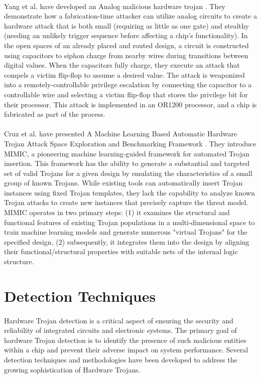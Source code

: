 \paragraph*{}
Yang et al. have developed an Analog malicious hardware trojan \cite{7546493}. They demonstrate how a fabrication-time attacker can utilize analog circuits to create a hardware attack that is both small (requiring as little as one gate) and stealthy (needing an unlikely trigger sequence before affecting a chip's functionality). In the open spaces of an already placed and routed design, a circuit is constructed using capacitors to siphon charge from nearby wires during transitions between digital values. When the capacitors fully charge, they execute an attack that compels a victim flip-flop to assume a desired value. The attack is weaponized into a remotely-controllable privilege escalation by connecting the capacitor to a controllable wire and selecting a victim flip-flop that stores the privilege bit for their processor. This attack is implemented in an OR1200 processor, and a chip is fabricated as part of the process.
\paragraph*{}
Cruz et al. have presented A Machine Learning Based Automatic Hardware Trojan Attack Space Exploration and Benchmarking Framework \cite{cruz2022machine}. They introduce MIMIC, a pioneering machine learning-guided framework for automated Trojan insertion. This framework has the ability to generate a substantial and targeted set of valid Trojans for a given design by emulating the characteristics of a small group of known Trojans. While existing tools can automatically insert Trojan instances using fixed Trojan templates, they lack the capability to analyze known Trojan attacks to create new instances that precisely capture the threat model. MIMIC operates in two primary steps: (1) it examines the structural and functional features of existing Trojan populations in a multi-dimensional space to train machine learning models and generate numerous "virtual Trojans" for the specified design, (2) subsequently, it integrates them into the design by aligning their functional/structural properties with suitable nets of the internal logic structure. 
\section{Detection Techniques}
\paragraph*{}
Hardware Trojan detection is a critical aspect of ensuring the security and reliability of integrated circuits and electronic systems. The primary goal of hardware Trojan detection is to identify the presence of such malicious entities within a chip and prevent their adverse impact on system performance. Several detection techniques and methodologies have been developed to address the growing sophistication of Hardware Trojans.
